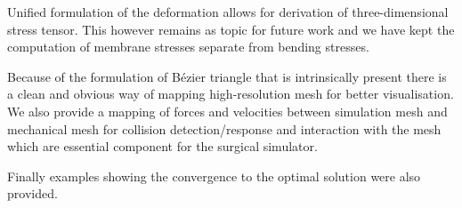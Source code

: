 \documentclass{egpubl}
\begin{document}
Unified formulation of the deformation allows for derivation of three-dimensional 
stress tensor. This however remains as topic for future work and
we have kept the computation of membrane stresses separate from bending stresses.

Because of the formulation of B\'ezier triangle that is intrinsically present
there is a clean and obvious way of mapping high-resolution mesh for
better visualisation. We also provide a mapping of forces and velocities
between simulation mesh and mechanical mesh for collision detection/response
and interaction with the mesh which are essential component for the surgical
simulator.

Finally examples showing the convergence to the optimal solution were also provided. 



%



\end{document}
